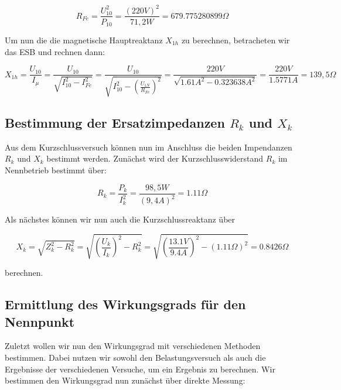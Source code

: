 \documentclass{article}
\begin{document}
\begin{equation*}
  R_{Fe} = \frac{U_{10}^{2}}{P_{10}} = \frac{(220V)^{2}}{71,2W} = 679.775280899\Omega
\end{equation*}

Um nun die die magnetische Hauptreaktanz $X_{1h}$ zu berechnen, betracheten wir das ESB und rechnen dann:

\begin{equation*}
  X_{1h} = \frac{U_{10}}{I_{\mu}} = \frac{U_{10}}{\sqrt{I_{10}^{2}-I_{Fe}^{2}}} = \frac{U_{10}}{\sqrt{I_{10}^{2}-\left(\frac{U_{1N}}{R_{Fe}}\right)^{2}}} = \frac{220V}{\sqrt{1.61A^{2}-0.323638A^{2}}} = \frac{220V}{1.5771A} = 139,5\Omega
\end{equation*}

\subsection{Bestimmung der Ersatzimpedanzen $R_{k}$ und $X_{k}$}
\label{sec:best-der-ersatz-1}

Aus dem Kurzschlussversuch können nun im Anschluss die beiden Impendanzen $R_{k}$ und $X_{k}$ bestimmt werden. Zunächst wird der Kurzschlusswiderstand $R_{k}$ im Nennbetrieb bestimmt über:

\begin{equation*}
  R_{k} = \frac{P_{k}}{I_{k}^{2}} = \frac{98,5W}{(9,4A)^{2}} = 1.11\Omega
\end{equation*}

Als nächstes können wir nun auch die Kurzschlussreaktanz über

\begin{equation*}
  X_{k} = \sqrt{Z_{k}^{2}-R_{k}^{2}} = \sqrt{\left(\frac{U_{k}}{I_{k}}\right)^{2}-R_{k}^{2}} = \sqrt{\left(\frac{13.1V}{9.4A}\right)^{2} - (1.11\Omega)^{2}} = 0.8426\Omega
\end{equation*}

berechnen.

\subsection{Ermittlung des Wirkungsgrads für den Nennpunkt}
\label{sec:ermittl-des-wirk}

Zuletzt wollen wir nun den Wirkungsgrad mit verschiedenen Methoden bestimmen. Dabei nutzen wir sowohl den Belastungsversuch als auch die Ergebnisse der verschiedenen Versuche, um ein Ergebnis zu berechnen. Wir bestimmen den Wirkungsgrad nun zunächst über direkte Messung:
\end{document}
